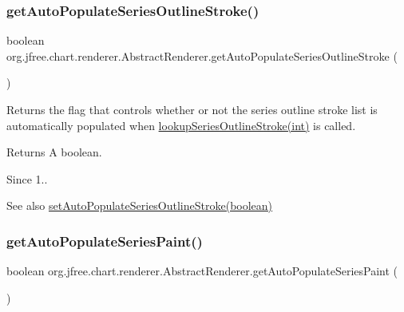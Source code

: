 \subsubsection{\texorpdfstring{get\+Auto\+Populate\+Series\+Outline\+Stroke()}{getAutoPopulateSeriesOutlineStroke()}}
{\footnotesize\ttfamily boolean org.\+jfree.\+chart.\+renderer.\+Abstract\+Renderer.\+get\+Auto\+Populate\+Series\+Outline\+Stroke (\begin{DoxyParamCaption}{ }\end{DoxyParamCaption})}

Returns the flag that controls whether or not the series outline stroke list is automatically populated when \mbox{\hyperlink{classorg_1_1jfree_1_1chart_1_1renderer_1_1_abstract_renderer_aab0f5b5e5cc74fae532800cd503c3612}{lookup\+Series\+Outline\+Stroke(int)}} is called.

\begin{DoxyReturn}{Returns}
A boolean.
\end{DoxyReturn}
\begin{DoxySince}{Since}
1..
\end{DoxySince}
\begin{DoxySeeAlso}{See also}
\mbox{\hyperlink{classorg_1_1jfree_1_1chart_1_1renderer_1_1_abstract_renderer_a4014d0855f984a12057d5045d736fa0a}{set\+Auto\+Populate\+Series\+Outline\+Stroke(boolean)}} 
\end{DoxySeeAlso}
\mbox{\label{classorg_1_1jfree_1_1chart_1_1renderer_1_1_abstract_renderer_ad5056b1fd510436f90654a32c97dafd2}} 
\subsubsection{\texorpdfstring{get\+Auto\+Populate\+Series\+Paint()}{getAutoPopulateSeriesPaint()}}
{\footnotesize\ttfamily boolean org.\+jfree.\+chart.\+renderer.\+Abstract\+Renderer.\+get\+Auto\+Populate\+Series\+Paint (\begin{DoxyParamCaption}{ }\end{DoxyParamCaption})}

